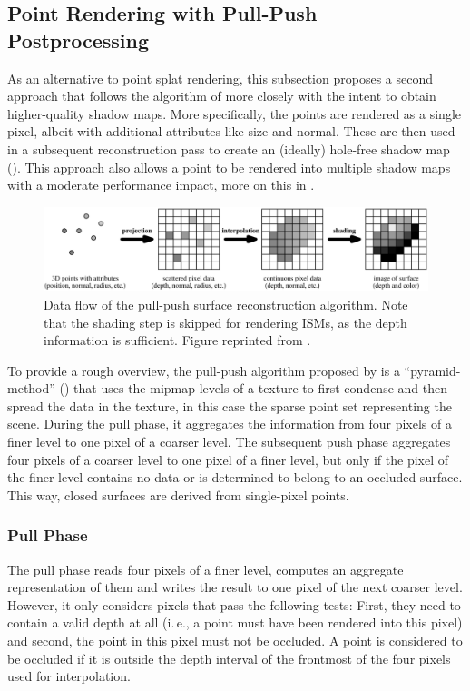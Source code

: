 \subsection{Point Rendering with Pull-Push Postprocessing}

As an alternative to point splat rendering, this subsection proposes a second approach that follows the algorithm of \citet{Marroquim:2007:reconstruction} more closely with the intent to obtain higher-quality shadow maps. More specifically, the points are rendered as a single pixel, albeit with additional attributes like size and normal. These are then used in a subsequent reconstruction pass to create an (ideally) hole-free shadow map (). This approach also allows a point to be rendered into multiple shadow maps with a moderate performance impact, more on this in .


\begin{figure}[htb]
\centering
    \includegraphics[width=\textwidth]{graphics/pullpush_dataflow_marroquim}
  \caption{Data flow of the pull-push surface reconstruction algorithm. Note that the shading step is skipped for rendering ISMs, as the depth information is sufficient. Figure reprinted from \citet{Marroquim:2007:reconstruction}.}
  \label{fig:concept:pull_push_dataflow_marroquim}
\end{figure}


To provide a rough overview, the pull-push algorithm proposed by \citet{Marroquim:2007:reconstruction} is a ``pyramid-method'' (\cite{Strengert:2006:Pyramid}) that uses the mipmap levels of a texture to first condense and then spread the data in the texture, in this case the sparse point set representing the scene. During the pull phase, it aggregates the information from four pixels of a finer level to one pixel of a coarser level. The subsequent push phase aggregates four pixels of a coarser level to one pixel of a finer level, but only if the pixel of the finer level contains no data or is determined to belong to an occluded surface. This way, closed surfaces are derived from single-pixel points.


\subsubsection{Pull Phase}
The pull phase reads four pixels of a finer level, computes an aggregate representation of them and writes the result to one pixel of the next coarser level. However, it only considers pixels that pass the following tests: First, they need to contain a valid depth at all (i.\,e., a point must have been rendered into this pixel) and second, the point in this pixel must not be occluded. A point is considered to be occluded if it is outside the depth interval of the frontmost of the four pixels used for interpolation.

